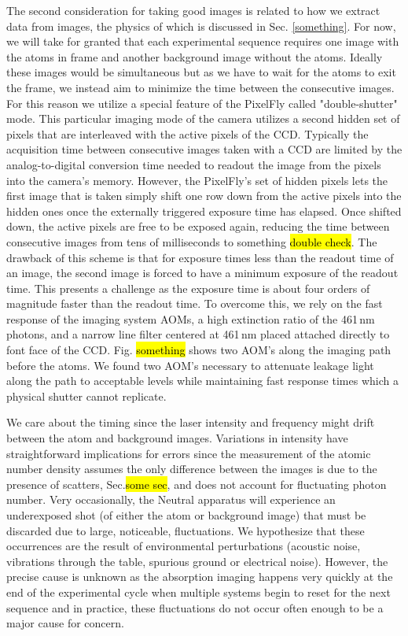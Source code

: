 The second consideration for taking good images is related to how we extract data from images, the physics of which is discussed in Sec. \ref{something}.
For now, we will take for granted that each experimental sequence requires one image with the atoms in frame and another background image without the atoms.
Ideally these images would be simultaneous but as we have to wait for the atoms to exit the frame, we instead aim to minimize the time between the consecutive images.
For this reason we utilize a special feature of the PixelFly called "double-shutter" mode.
This particular imaging mode of the camera utilizes a second hidden set of pixels that are interleaved with the active pixels of the CCD.
Typically the acquisition time between consecutive images taken with a CCD are limited by the analog-to-digital conversion time needed to readout the image from the pixels into the camera's memory.
However, the PixelFly's set of hidden pixels lets the first image that is taken simply shift one row down from the active pixels into the hidden ones once the externally triggered exposure time has elapsed.
Once shifted down, the active pixels are free to be exposed again, reducing the time between consecutive images from tens of milliseconds to something \hl{double check}.
The drawback of this scheme is that for exposure times less than the readout time of an image, the second image is forced to have a minimum exposure of the readout time.
This presents a challenge as the exposure time is about four orders of magnitude faster than the readout time.
To overcome this, we rely on the fast response of the imaging system AOMs, a high extinction ratio of the 461\,nm photons, and a narrow line filter centered at 461\,nm placed attached directly to font face of the CCD.
Fig. \hl{something} shows two AOM's along the imaging path before the atoms.
We found two AOM's necessary to attenuate leakage light along the path to acceptable levels while maintaining fast response times which a physical shutter cannot replicate.

We care about the timing since the laser intensity and frequency might drift between the atom and background images. 
Variations in intensity have straightforward implications for errors since the measurement of the atomic number density assumes the only difference between the images is due to the presence of scatters, Sec.\hl{some sec}, and does not account for fluctuating photon number. 
Very occasionally, the Neutral apparatus will experience an underexposed shot (of either the atom or background image) that must be discarded due to large, noticeable, fluctuations. 
We hypothesize that these occurrences are the result of environmental perturbations (acoustic noise, vibrations through the table, spurious ground or electrical noise). 
However, the precise cause is unknown as the absorption imaging happens very quickly at the end of the experimental cycle when multiple systems begin to reset for the next sequence and in practice, these fluctuations do not occur often enough to be a major cause for concern.

